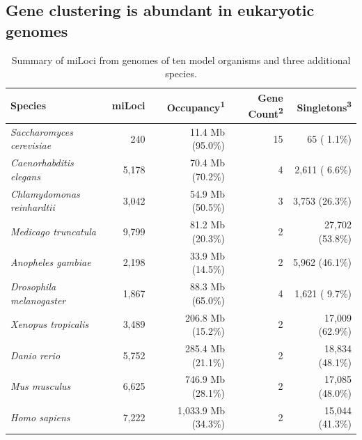 \subsection{Gene clustering is abundant in eukaryotic genomes}

\begin{table}
\small
\caption{Summary of miLoci from genomes of ten model organisms and three additional species.}
\label{Table:miLocusSummaryModOrg}
\begin{tabularx}{\textwidth}{lrrrr}
\hline
                            Species &               miLoci & Occupancy\textsuperscript{1} & Gene Count\textsuperscript{2} & Singletons\textsuperscript{3}  \\ \hline
\textit{Saccharomyces cerevisiae}   &                  240 &             11.4 Mb (95.0\%) &                            15 &                   65 ( 1.1\%)  \\
\textit{Caenorhabditis elegans}     &                5,178 &             70.4 Mb (70.2\%) &                             4 &                2,611 ( 6.6\%)  \\
\textit{Chlamydomonas reinhardtii}  &                3,042 &             54.9 Mb (50.5\%) &                             3 &                3,753 (26.3\%)  \\
\textit{Medicago truncatula}        &                9,799 &             81.2 Mb (20.3\%) &                             2 &               27,702 (53.8\%)  \\
\textit{Anopheles gambiae}          &                2,198 &             33.9 Mb (14.5\%) &                             2 &                5,962 (46.1\%)  \\
\textit{Drosophila melanogaster}    &                1,867 &             88.3 Mb (65.0\%) &                             4 &                1,621 ( 9.7\%)  \\
\textit{Xenopus tropicalis}         &                3,489 &            206.8 Mb (15.2\%) &                             2 &               17,009 (62.9\%)  \\
\textit{Danio rerio}                &                5,752 &            285.4 Mb (21.1\%) &                             2 &               18,834 (48.1\%)  \\
\textit{Mus musculus}               &                6,625 &            746.9 Mb (28.1\%) &                             2 &               17,085 (48.0\%)  \\
\textit{Homo sapiens}               &                7,222 &          1,033.9 Mb (34.3\%) &                             2 &               15,044 (41.3\%)  \\ \hline

\end{tabularx}
\end{table}
